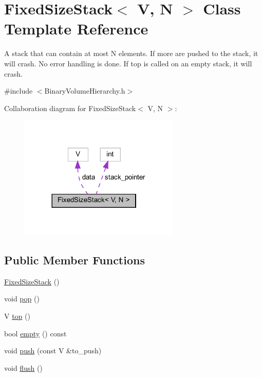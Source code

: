 \hypertarget{classFixedSizeStack}{}\section{Fixed\+Size\+Stack$<$ V, N $>$ Class Template Reference}
\label{classFixedSizeStack}


A stack that can contain at most N elements. If more are pushed to the stack, it will crash. No error handling is done. If top is called on an empty stack, it will crash.  




{\ttfamily \#include $<$Binary\+Volume\+Hierarchy.\+h$>$}



Collaboration diagram for Fixed\+Size\+Stack$<$ V, N $>$\+:
\nopagebreak
\begin{figure}[H]
\begin{center}
\leavevmode
\includegraphics[width=216pt]{classFixedSizeStack__coll__graph}
\end{center}
\end{figure}
\subsection*{Public Member Functions}
\begin{DoxyCompactItemize}
\item 
\mbox{\hyperlink{classFixedSizeStack_ab8090e6bfc34b69664fde6f7a9663071}{Fixed\+Size\+Stack}} ()
\item 
void \mbox{\hyperlink{classFixedSizeStack_a544e3fb119f4b93093db0f52b62bffb1}{pop}} ()
\item 
V \mbox{\hyperlink{classFixedSizeStack_a155565554dcbfade8363d3d6035613c5}{top}} ()
\item 
bool \mbox{\hyperlink{classFixedSizeStack_a6271318779d6b69768a28a5675fa9136}{empty}} () const
\item 
void \mbox{\hyperlink{classFixedSizeStack_abaa79c280f2ff9adb3ae919a0a8607fb}{push}} (const V \&to\+\_\+push)
\item 
void \mbox{\hyperlink{classFixedSizeStack_a62d9af2dd2c3d9e852a297483f4c4c50}{flush}} ()
\end{DoxyCompactItemize}
